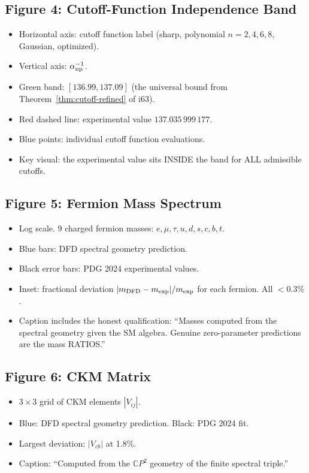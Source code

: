 \documentclass[11pt,a4paper]{article}
\newcommand{\CP}{\mathbb{C}P}
\begin{document}
\subsection{Figure 4: Cutoff-Function Independence Band}

\begin{itemize}
\item Horizontal axis: cutoff function label (sharp, polynomial $n=2,4,6,8$, Gaussian, optimized).
\item Vertical axis: $\alpha^{-1}_{\rm np}$.
\item Green band: $[136.99, 137.09]$ (the universal bound from Theorem~\ref{thm:cutoff-refined} of i63).
\item Red dashed line: experimental value $137.035\,999\,177$.
\item Blue points: individual cutoff function evaluations.
\item Key visual: the experimental value sits INSIDE the band for ALL admissible cutoffs.
\end{itemize}

\subsection{Figure 5: Fermion Mass Spectrum}

\begin{itemize}
\item Log scale. 9 charged fermion masses: $e, \mu, \tau, u, d, s, c, b, t$.
\item Blue bars: DFD spectral geometry prediction.
\item Black error bars: PDG 2024 experimental values.
\item Inset: fractional deviation $|m_{\rm DFD} - m_{\rm exp}|/m_{\rm exp}$ for each fermion. All $< 0.3\%$.
\item Caption includes the honest qualification: ``Masses computed from the spectral geometry given the SM algebra. Genuine zero-parameter predictions are the mass RATIOS.''
\end{itemize}

\subsection{Figure 6: CKM Matrix}

\begin{itemize}
\item $3 \times 3$ grid of CKM elements $|V_{ij}|$.
\item Blue: DFD spectral geometry prediction. Black: PDG 2024 fit.
\item Largest deviation: $|V_{cb}|$ at 1.8\%.
\item Caption: ``Computed from the $\CP^2$ geometry of the finite spectral triple.''
\end{itemize}
\end{document}
